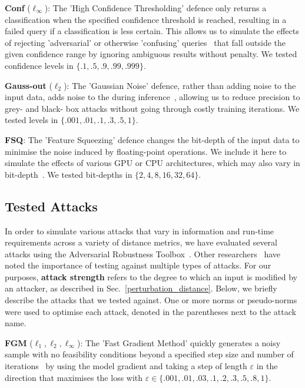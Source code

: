 \textbf{Conf} ($\ell_{\infty}$): The 'High Confidence Thresholding' defence only returns a classification when the specified confidence threshold is reached, resulting in a failed query if a classification is less certain. This allows us to simulate the effects of rejecting 'adversarial' or otherwise 'confusing' queries~\cite{high_conf} that fall outside the given confidence range by ignoring ambiguous results without penalty. We tested confidence levels in $\{.1, .5, .9, .99, .999\}$.

\textbf{Gauss-out} ($\ell_2$): The 'Gaussian Noise' defence, rather than adding noise to the input data, adds noise to the during inference~\cite{gauss_out}, allowing us to reduce precision to grey- and black- box attacks without going through costly training iterations. We tested levels in $\{.001, .01, .1, .3, .5, 1\}$. 

\textbf{FSQ}: The 'Feature Squeezing' defence changes the bit-depth of the input data to minimise the noise induced by floating-point operations. We include it here to simulate the effects of various GPU or CPU architectures, which may also vary in bit-depth~\cite{feature_squeezing}. We tested bit-depths in $\{2, 4, 8, 16, 32, 64\}$.



\subsection{Tested Attacks}
\label{attacks}

In order to simulate various attacks that vary in information and run-time requirements across a variety of distance metrics, we have evaluated several attacks using the Adversarial Robustness Toolbox~\cite{art2018}. Other researchers~\cite{carlini_towards_2017} have noted the importance of testing against multiple types of attacks. For our purposes, \textbf{attack strength} refers to the degree to which an input is modified by an attacker, as described in Sec.~\ref{perturbation_distance}. Below, we briefly describe the attacks that we tested against. One or more norms or pseudo-norms were used to optimise each attack, denoted in the parentheses next to the attack name. 

\textbf{FGM} ($\ell_1, \ell_2, \ell_{\infty}$): The 'Fast Gradient Method' quickly generates a noisy sample with no feasibility conditions beyond a specified step size and number of iterations~\cite{fgm} by using the model gradient and taking a step of length $\varepsilon$ in the direction that maximises the loss with $\varepsilon \in \{.001,.01,.03,.1,.2,.3,.5,.8,1\}$.

